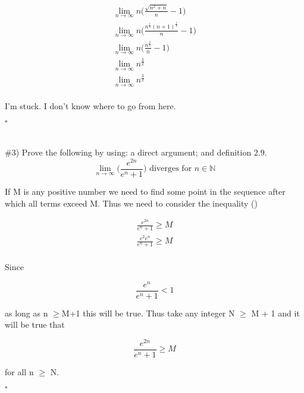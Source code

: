 \documentclass[11pt]{article}
\begin{document}
\begin{equation}
	\begin{aligned}
		\lim_{n \rightarrow \infty} n\big(\frac{\sqrt{n^2+n}}{n}-1\big) \\
		\lim_{n \rightarrow \infty} n\big(\frac{{n^{\frac{1}{2}}(n+1)^{\frac{1}{2}}}}{n}-1\big) \\
		\lim_{n \rightarrow \infty} n\big(\frac{n^{\frac{3}{2}}}{n}-1\big) \\
		\lim_{n \rightarrow \infty} n^{\frac{3}{2}} \\
		\lim_{n \rightarrow \infty} n^{\frac{3}{2}} \\
	\end{aligned}
\end{equation}

I'm stuck.  I don't know where to go from here.

$\square$

\section{}

\#3) Prove the following by using: a direct argument; and definition 2.9.
\begin{equation}
	\lim_{n \rightarrow \infty} \bigg(\frac{e^{2n}}{e^n+1}\bigg)\text{ diverges for }n \in \mathbb{N}
\end{equation}

If M is any positive number we need to find some point in the sequence after which all terms exceed M. Thus we need to consider the inequality (\cite{tbb})

\begin{equation}
	\begin{aligned}
		\frac{e^{2n}}{e^n+1}\ge M \\
		\frac{e^2 e^n}{e^n+1}\ge M \\
	\end{aligned}
\end{equation}

Since

\begin{equation}
	\frac{e^{n}}{e^n+1} < 1
\end{equation}

as long as n $\ge$M+1 this will be true. Thus take any integer N $\ge$ M + 1 and it will be true that

\begin{equation}
	\frac{e^{2n}}{e^n+1}\ge M
\end{equation}

for all n $\ge$ N.

$\square$

\printbibliography
\end{document}
